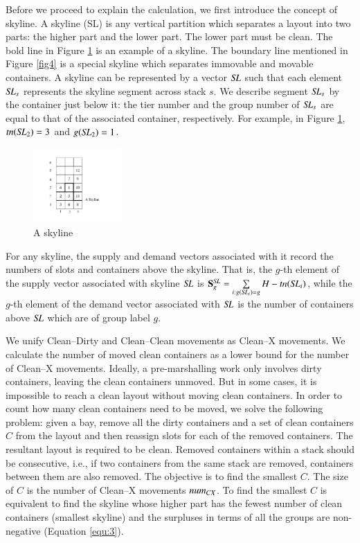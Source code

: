 \documentclass[review,3p,times,authoryear,12pt]{elsarticle}
\begin{document}
Before we proceed to explain the calculation, we first introduce the concept of skyline. A skyline (SL) is any vertical partition which separates a layout into two parts: the higher part and the lower part. The lower part must be clean. The bold line in Figure \ref{fig5} is an example of a skyline. The boundary line mentioned in Figure \ref{fig4} is a special skyline which separates immovable and movable containers. A skyline can be represented by a vector $\id{SL}$ such that each element $\id{SL}_s$ represents the skyline segment across stack $s$. We describe segment $\id{SL}_s$ by the container just below it: the tier number and the group number of $\id{SL}_s$ are equal to that of the associated container, respectively. For example, in Figure \ref{fig5}, $\id{tn}(\id{SL}_{2})=3$ and $g(\id{SL}_{2})=1$.


\begin{figure}[htbp]
\centering
\includegraphics[width=0.3\textwidth]{fig5.pdf}
\caption{A skyline}
\label{fig5}
\end{figure}

For any skyline, the supply and demand vectors associated with it record the numbers of slots and containers above the skyline. That is, the $g$-th element of the supply vector associated with skyline $\id{SL}$ is $\mathbf S^\id{SL}_g=\sum\limits_{i:g(\id{SL}_i)=g}H-\id{tn}(\id{SL}_i)$, while the $g$-th element of the demand vector associated with $\id{SL}$ is the number of containers above $\id{SL}$ which are of group label $g$.

We unify Clean--Dirty and Clean--Clean movements as Clean--X movements. We calculate the number of moved clean containers as a lower bound for the number of Clean--X movements. Ideally, a pre-marshalling work only involves dirty containers, leaving the clean containers unmoved. But in some cases, it is impossible to reach a clean layout without moving clean containers. In order to count how many clean containers need to be moved, we solve the following problem: given a bay, remove all the dirty containers and a set of clean containers $C$ from the layout and then reassign slots for each of the removed containers. The resultant layout is required to be clean. Removed containers within a stack should be consecutive, i.e., if two containers from the same stack are removed, containers between them are also removed. The objective is to find the smallest $C$. The size of $C$ is the number of Clean--X movements $\id{num}_{CX}$. To find the smallest $C$ is equivalent to find the skyline whose higher part has the fewest number of clean containers (smallest skyline) and the surpluses in terms of all the groups are non-negative (Equation \ref{equ:3}).
\end{document}
